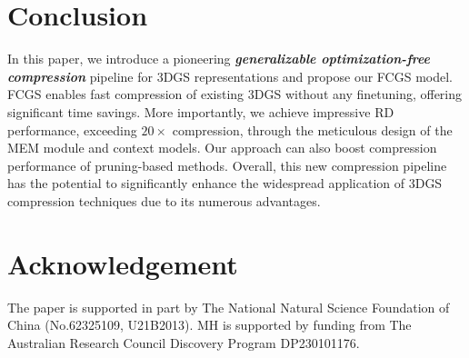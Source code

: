 \documentclass{article} %
\begin{document}
\section{Conclusion}

In this paper, we introduce a pioneering \textbf{\textit{generalizable optimization-free compression}} pipeline for 3DGS representations and propose our FCGS model. FCGS enables fast compression of existing 3DGS without any finetuning, offering significant time savings. More importantly, we achieve impressive RD performance, exceeding $20\times$ compression, through the meticulous design of the MEM module and context models. Our approach can also boost compression performance of pruning-based methods. Overall, this new compression pipeline has the potential to significantly enhance the widespread application of 3DGS compression techniques due to its numerous advantages.

\clearpage

\section*{Acknowledgement}
The paper is supported in part by The National Natural Science Foundation of China (No.62325109, U21B2013).
MH is supported by funding from The Australian Research Council Discovery Program DP230101176.




\appendix

\clearpage
\setcounter{page}{1}

\renewcommand\thesection{\Alph{section}}
\renewcommand\thetable{\Alph{table}}
\renewcommand\thefigure{\Alph{figure}}
\setcounter{section}{0}
\setcounter{table}{0}
\setcounter{figure}{0}
\end{document}

